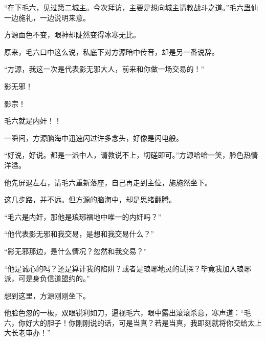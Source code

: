 \begin{this_body}
“在下毛六，见过第二城主。今次拜访，主要是想向城主请教战斗之道。”毛六蛊仙一边施礼，一边说明来意。

方源面色不变，眼神却陡然变得冰寒无比。

原来，毛六口中这么说，私底下对方源暗中传音，却是另一番说辞。

“方源，我这一次是代表影无邪大人，前来和你做一场交易的！”

影无邪！

影宗！

毛六就是内奸！！

一瞬间，方源脑海中迅速闪过许多念头，好像是闪电般。

“好说，好说。都是一派中人，请教说不上，切磋即可。”方源哈哈一笑，脸色热情洋溢。

他先屏退左右，请毛六重新落座，自己再走到主位，施施然坐下。

这几步路，并不远。但方源的脑海中，却是思绪翻腾。

“毛六是内奸，那他是琅琊福地中唯一的内奸吗？”

“他代表影无邪和我交易，是想和我交易什么？”

“影无邪那边，是什么情况？忽然和我交易？”

“他是诚心的吗？还是算计我的陷阱？或者是琅琊地灵的试探？毕竟我加入琅琊派，可是身负信道盟约的。”

想到这里，方源刚刚坐下。

他脸色忽的一板，双眼锐利如刀，逼视毛六，眼中露出滚滚杀意，寒声道：“毛六，你好大的胆子！你刚刚说的话，可是当真？若是当真，我即刻就将你交给太上大长老审办！”

\end{this_body}

